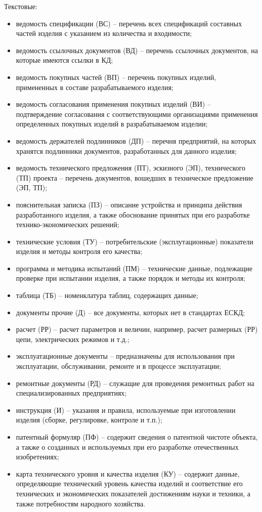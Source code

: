 \documentclass[unicode, 12pt, a4paper, oneside]{article}
\begin{document}
Текстовые:
\begin{itemize}
\item ведомость спецификации (ВС) – перечень всех спецификаций составных частей изделия с указанием из количества и входимости;
\item  ведомость ссылочных документов (ВД) – перечень ссылочных документов, на которые имеются ссылки в КД;
\item ведомость покупных частей (ВП) – перечень покупных изделий, примененных в составе разрабатываемого изделия; \item ведомость согласования применения покупных изделий (ВИ) – подтверждение согласования с соответствующими организациями применения определенных покупных изделий в разрабатываемом изделии;
\item ведомость держателей подлинников (ДП) – перечня предприятий, на которых хранятся подлинники документов, разработанных для данного изделия;
\item ведомость технического предложения (ПТ), эскизного (ЭП), технического (ТП) проекта – перечень документов, вошедших в техническое предложение (ЭП, ТП);
\item пояснительная записка (ПЗ) – описание устройства и принципа действия разработанного изделия, а также обоснование принятых при его разработке технико-экономических решений;
\item технические условия (ТУ) – потребительские (эксплутационные) показатели изделия и методы контроля его качества;
\item программа и методика испытаний (ПМ) – технические данные, подлежащие проверке при испытании изделия, а также порядок и методы их контроля;
\item таблица (ТБ) – номенклатура таблиц, содержащих данные;
\item документы прочие (Д) – все документы, которых нет в стандартах ЕСКД;
\item расчет (РР) – расчет параметров и величин, например, расчет размерных (РР) цепи, электрических режимов и т.д.; \item эксплуатационные документы – предназначены для использования при эксплуатации, обслуживании, ремонте и в процессе эксплуатации;
\item ремонтные документы (РД) – служащие для проведения ремонтных работ на специализированных предприятиях;
\item инструкция (И) – указания и правила, используемые при изготовлении изделия (сборке, регулировке, контроле и т.п.);
\item патентный формуляр (ПФ) – содержит сведения о патентной чистоте объекта, а также о созданных и используемых при его разработке отечественных изобретениях;
\item карта технического уровня и качества изделия (КУ) – содержит данные, определяющие технический уровень качества изделий и соответствие его технических и экономических показателей достижениям науки и техники, а также потребностям народного хозяйства.
\end{itemize}
\end{document}
